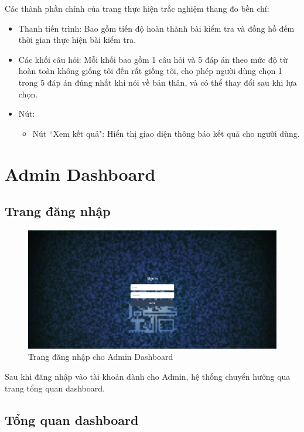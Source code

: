 Các thành phần chính của trang thực hiện trắc nghiệm thang đo bền chí:
\begin{itemize}
    \item Thanh tiến trình: Bao gồm tiến độ hoàn thành bài kiểm tra và đồng hồ đếm thời gian thực hiện bài kiểm tra.
    \item Các khối câu hỏi: Mỗi khối bao gồm 1 câu hỏi và 5 đáp án theo mức độ từ hoàn toàn không giống tôi đến rất giống tôi, cho phép người dùng chọn 1 trong 5 đáp án đúng nhất khi nói về bản thân, và có thể thay đổi sau khi lựa chọn.
    \item Nút:
        \begin{itemize}
            \item Nút ``Xem kết quả": Hiển thị giao diện thông báo kết quả cho người dùng.
        \end{itemize}
\end{itemize}


\section{Admin Dashboard}
\subsection{Trang đăng nhập}

\begin{figure}[H]
    \centering
    \includegraphics[width=0.8\linewidth]{images/dashboardLogin.png}
    \vspace{0.6cm}
    \caption{Trang đăng nhập cho Admin Dashboard}
\end{figure}

Sau khi đăng nhập vào tài khoản dành cho Admin, hệ thống chuyển hướng qua trang tổng quan dashboard.

\subsection{Tổng quan dashboard}


